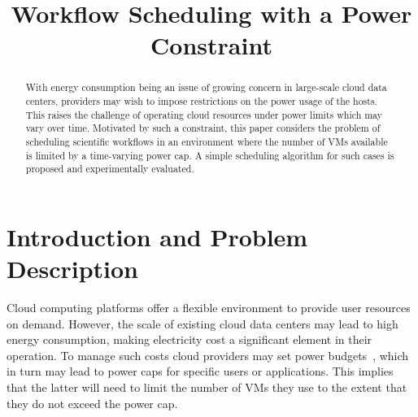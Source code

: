 \documentclass[10pt, conference, compsocconf]{IEEEtran} %
\begin{document}
\title{Workflow Scheduling with a Power Constraint}
\author{
}

\maketitle

\begin{abstract}
With energy consumption being an issue of growing concern in large-scale cloud data centers, providers may wish to impose restrictions on the power usage of the hosts.
This raises the challenge of operating cloud resources under power limits which may vary over time.
Motivated by such a constraint, this paper considers the problem of scheduling scientific workflows in an environment where the number of VMs available is limited by a time-varying power cap.
A simple scheduling algorithm for such cases is proposed and experimentally evaluated.
\end{abstract}

\section{Introduction and Problem Description} %
\label{sec:intr-probl-descr}

Cloud computing platforms offer a flexible environment to provide user resources on demand.
However, the scale of existing cloud data centers may lead to high energy consumption, making electricity cost a significant element in their operation.
To manage such costs cloud providers may set power budgets~\cite{zhang2011capping}, which in turn may lead to power caps for specific users or applications.
This implies that the latter will need to limit the number of VMs they use to the extent that they do not exceed the power cap.
\end{document}
